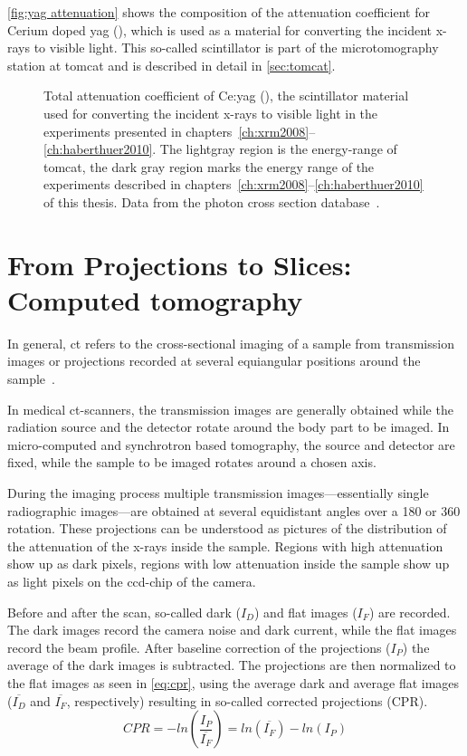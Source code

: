 \autoref{fig:yag attenuation} shows the composition of the attenuation coefficient for Cerium doped \ac{yag} (), which is used as a material for converting the incident x-rays to visible light. This so-called scintillator is part of the microtomography station at \ac{tomcat} and is described in detail in \autoref{sec:tomcat}.

\def\width{\linewidth}%
\def\height{0.618\linewidth}%
\begin{figure}[htb]%
	\noindent\makebox[\textwidth]{%
		\centering
		}
	\caption[Total attenuation coefficient of Ce:\acs{yag}]{Total attenuation coefficient of Ce:\acs{yag} (), the scintillator material used for converting the incident x-rays to visible light in the experiments presented in chapters~\ref{ch:xrm2008}--\ref{ch:haberthuer2010}. The lightgray region is the energy-range of \ac{tomcat}, the dark gray region marks the energy range of the experiments described in chapters~\autoref{ch:xrm2008}--\ref{ch:haberthuer2010} of this thesis. Data from the photon cross section database~\cite{XCOM}.}
	\label{fig:yag attenuation}
\end{figure}%

\section{From Projections to Slices: Computed tomography}
In general, \ac{ct} refers to the cross-sectional imaging of a sample from transmission images or projections recorded at several equiangular positions around the sample~\cite{Kak2002}.

In medical \ac{ct}-scanners, the transmission images are generally obtained while the radiation source and the detector rotate around the body part to be imaged. In micro-computed and synchrotron based tomography, the source and detector are fixed, while the sample to be imaged rotates around a chosen axis.

During the imaging process multiple transmission images---essentially single radiographic images---are obtained at several equidistant angles over a \unit{180}{\degree} or \unit{360}{\degree} rotation. These projections can be understood as pictures of the distribution of the attenuation of the x-rays inside the sample. Regions with high attenuation show up as dark pixels, regions with low attenuation inside the sample show up as light pixels on the \ac{ccd}-chip of the camera.

Before and after the scan, so-called dark ($I_{D}$) and flat images ($I_{F}$) are recorded. The dark images record the camera noise and dark current, while the flat images record the beam profile. After baseline correction of the projections ($I_{P}$) the average of the dark images is subtracted. The projections are then normalized to the flat images as seen in \autoref{eq:cpr}, using the average dark and average flat images ($\overline{I_{D}}$ and $\overline{I_{F}}$, respectively) resulting in so-called corrected projections (CPR).%
\begin{equation}%
	CPR=-ln\left(\frac{I_{P}}{\overline{I_{F}}}\right)=ln(\overline{I_{F}})-ln(I_{P})%
	\label{eq:cpr}%
\end{equation}%

